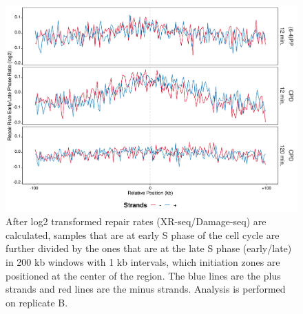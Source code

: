 \begin{figure}[H]
\begin{center}
\includegraphics[width=\textwidth]{Chapters/7_appendix/figures/supfig41}
\caption[Repair rate early/late ratio of initiation zones in 200 kb (replicate B).]{After log2 transformed repair rates (XR-seq/Damage-seq) are calculated, samples that are at early S phase of the cell cycle are further divided by the ones that are at the late S phase (early/late) in 200 kb windows with 1 kb intervals, which initiation zones are positioned at the center of the region. The blue lines are the plus strands and red lines are the minus strands. Analysis is performed on replicate B.}
\label{supfig:rrel200inzonesB}
\end{center}
\end{figure}

